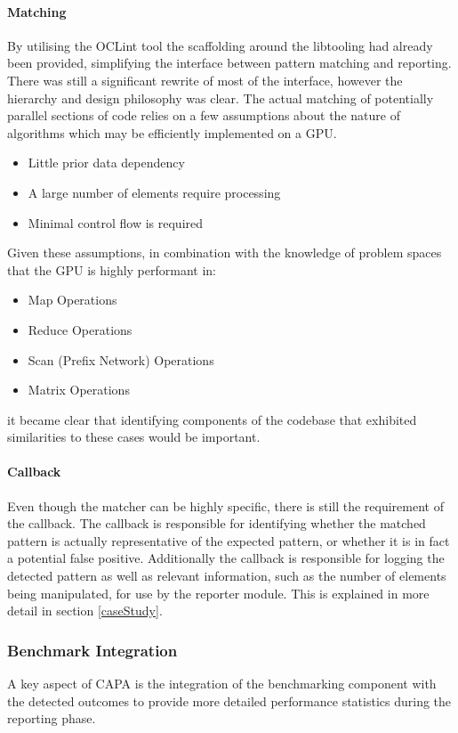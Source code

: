 \paragraph{Matching}
By utilising the OCLint tool the scaffolding around the libtooling had already been provided,
simplifying the interface between pattern matching and reporting. There was still a significant
rewrite of most of the interface, however the hierarchy and design philosophy was clear. The actual
matching of potentially parallel sections of code relies on a few assumptions about the nature of
algorithms which may be efficiently implemented on a GPU.
\begin{itemize}
    \item Little prior data dependency
    \item A large number of elements require processing
    \item Minimal control flow is required
\end{itemize}
Given these assumptions, in combination with the knowledge of problem spaces that the GPU is highly
performant in:
\begin{itemize}
    \item Map Operations
    \item Reduce Operations
    \item Scan (Prefix Network) Operations
    \item Matrix Operations
\end{itemize}
it became clear that identifying components of the codebase that exhibited similarities to these
cases would be important. 

\paragraph{Callback}
Even though the matcher can be highly specific, there is still the requirement of the callback. The
callback is responsible for identifying whether the matched pattern is actually representative of
the expected pattern, or whether it is in fact a potential false positive. Additionally the callback
is responsible for logging the detected pattern as well as relevant information, such as the number
of elements being manipulated, for use by the reporter module. This is explained in more detail
in section \ref{caseStudy}.

\subsubsection{Benchmark Integration}
A key aspect of CAPA is the integration of the benchmarking component with the detected outcomes to
provide more detailed performance statistics during the reporting phase.

